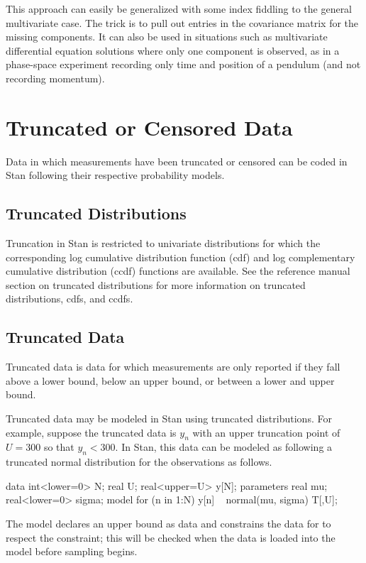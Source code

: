 This approach can easily be generalized with some index fiddling to
the general multivariate case.  The trick is to pull out entries in
the covariance matrix for the missing components.  It can also be used
in situations such as multivariate differential equation solutions
where only one component is observed, as in a phase-space experiment
recording only time and position of a pendulum (and not recording
momentum).


\chapter{Truncated or Censored Data}

\noindent
Data in which measurements have been truncated or censored can be
coded in Stan following their respective probability models.

\section{Truncated Distributions}\label{truncation.section}

Truncation in Stan is restricted to univariate distributions for which
the corresponding log cumulative distribution function (cdf) and log
complementary cumulative distribution (ccdf) functions are available.
See the reference manual section on truncated distributions for more
information on truncated distributions, cdfs, and ccdfs.

\section{Truncated Data}\label{truncated-data.section}

Truncated data is data for which measurements are only reported if
they fall above a lower bound, below an upper bound, or between a
lower and upper bound.

Truncated data may be modeled in Stan using truncated distributions.
For example, suppose the truncated data is $y_n$ with an upper
truncation point of $U = 300$ so that $y_n < 300$.  In Stan, this
data can be modeled as following a truncated normal distribution for
the observations as follows.
%
\begin{stancode}
data {
  int<lower=0> N;
  real U;
  real<upper=U> y[N];
}
parameters {
  real mu;
  real<lower=0> sigma;
}
model {
  for (n in 1:N)
    y[n] ~ normal(mu, sigma) T[,U];
}
\end{stancode}
%
The model declares an upper bound  as data and constrains
the data for  to respect the constraint;  this will be checked
when the data is loaded into the model before sampling begins.

